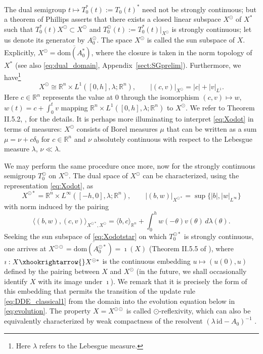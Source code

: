 \documentclass[a4paper, 12pt, oneside, reqno, notitlepage]{amsart}
\theoremstyle{plain}
\theoremstyle{definition}
\theoremstyle{remark}
\newcommand{\dom}{\mathrm{dom}}
\begin{document}
The dual semigroup $t \mapsto T_0^*(t):=T_0(t)^*$ need not be strongly continuous; but a theorem of Phillips \cite{phillips1955adjoint,hille1996functional}
asserts that there exists a closed linear subspace $X^{\odot}$ of $X^*$ such that $T_0^*(t)X^{\odot} \subset X^{\odot}$ and $T_0^\odot(t):=T_0^*(t)|_{X^\odot}$ is strongly continuous; let us denote its generator by $A_0^\odot$.
The space $X^{\odot}$ is called the sun subspace of $X$.
Explicitly, $X^\odot = \overline{\dom(A_0^*)}$, where the closure is taken in the norm topology of $X^*$ (see also \eqref{eq:dual_domain}, Appendix~\ref{sect:SGprelim}).
Furthermore, we have\footnote{Here $\lambda$ refers to the Lebesgue measure.}
\begin{equation}
    X^\odot  \cong \mathbb{R}^n \times L^1([0,h],\lambda; \mathbb{R}^n), \qquad | (c,v) |_{X^\odot} = |c| + |v|_{L^1}. 
    \label{eq:Xodot}
\end{equation}
Here $c \in \mathbb{R}^n$ represents the value at $0$ through the isomorphism $ (c,v) \mapsto w$, $w(t) = c + \int_0^t v$ mapping $ \mathbb{R}^n \times L^1([0,h],\lambda; \mathbb{R}^n)$ to $X^\odot$.
We refer to Theorem II.5.2, \cite{diekmann2012delay}, for the details.
It is perhaps more illuminating to interpret \eqref{eq:Xodot} in terms of measures: $X^{\odot }$ consists of Borel measures $\mu$ that can be written as a sum $\mu = \nu + c\delta_0$ for $c \in \mathbb{R}^n$ and $\nu$ absolutely continuous with respect to the Lebesgue measure $\lambda$, $\nu \ll \lambda$.

We may perform the same procedure once more, now for the strongly continuous semigroup $T_0^\odot$ on $X^\odot$.
The dual space of $X^\odot$ can be characterized, using the representation \eqref{eq:Xodot}, as
\begin{equation}
    X^{\odot *} = \mathbb{R}^n \times L^\infty ([-h,0],\lambda; \mathbb{R}^n), \qquad | (b,w) |_{X^{\odot*} } = \sup\{|b|,|w|_{L^\infty}\}
    \label{eq:Xodotstar}
\end{equation}
with norm induced by the pairing 
\begin{displaymath}
    \langle (b,w),(c,v) \rangle_{X^{\odot *},X^{\odot }} = \langle b,c \rangle_{\mathbb{R}^n} + \int_0^h w(-\theta) v(\theta) \,  d \lambda (\theta).
\end{displaymath}
Seeking the sun subspace of \eqref{eq:Xodotstar} on which $T_0^{\odot *}$ is strongly continuous, one arrives at $X^{\odot \odot} = \overline{\mathrm{dom}(A_0^{\odot *})} = \imath(X)$ (Theorem II.5.5 of \cite{diekmann2012delay}), where $\imath : X \xhookrightarrow{} X^{\odot *}$ is the continuous embedding $u \mapsto (u(0),u)$ defined by the pairing between $X$ and $X^\odot$ (in the future, we shall occasionally identify $X$ with its image under $\imath$).
We remark that it is precisely the form of this embedding 
that permits the transition of the update rule \eqref{eq:DDE_classical1} from the domain into the evolution equation below in \eqref{eq:evolution}.
The property $X = X^{\odot \odot}$ is called $\odot$-reflexivity, which can also be equivalently characterized by weak compactness of the resolvent $(\lambda \, \mathrm{id} - A_0)^{-1}$ \cite{de1989characterization}.
\end{document}
